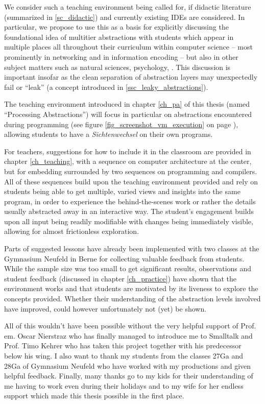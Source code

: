 We consider such a teaching environment being called for, if didactic literature (summarized in \ref{sc_didactic}) and currently existing \acp{IDE} are considered. In particular, we propose to use this as a basis for explicitly discussing the foundational idea of multitier abstractions with students which appear in multiple places all throughout their curriculum within computer science -- most prominently in networking and in information encoding -- but also in other subject matters such as natural sciences, psychology, \etc. This discussion is important insofar as the clean separation of abstraction layers may unexpectedly fail or ``leak'' (a concept introduced in \ref{ssc_leaky_abstractions}).

The teaching environment introduced in chapter \ref{ch_pa} of this thesis (named ``Processing Abstractions'') will focus in particular on abstractions encountered during programming (see \eg figure \ref{fig_screenshot_vm_execution} on page \pageref{fig_screenshot_vm_execution}), allowing students to have a \emph{Sichtenwechsel} on their own programs.

For teachers, suggestions for how to include it in the classroom are provided in chapter \ref{ch_teaching}, with a sequence on computer architecture at the center, but for embedding surrounded by two sequences on programming and compilers. All of these sequences build upon the teaching environment provided and rely on students being able to get multiple, varied views and insights into the same program, in order to experience the behind-the-scenes work or rather the details usually abstracted away in an interactive way. The student's engagement builds upon all input being readily modifiable with changes being immediately visible, allowing for almost frictionless exploration.

Parts of suggested lessons have already been implemented with two classes at the Gymnasium Neufeld in Berne for collecting valuable feedback from students. While the sample size was too small to get significant results, observations and student feedback (discussed in chapter \ref{ch_practice}) have shown that the environment works and that students are motivated by its liveness to explore the concepts provided. Whether their understanding of the abstraction levels involved have improved, could however unfortunately not (yet) be shown.

All of this wouldn't have been possible without the very helpful support of Prof.\,em. Oscar Nierstraz who has finally managed to introduce me to Smalltalk and Prof. Timo Kehrer who has taken this project together with his predecessor below his wing. I also want to thank my students from the classes 27Ga and 28Ga of Gymnasium Neufeld who have worked with my productions and given helpful feedback. Finally, many thanks go to my kids for their understanding of me having to work even during their holidays and to my wife for her endless support which made this thesis possible in the first place.
